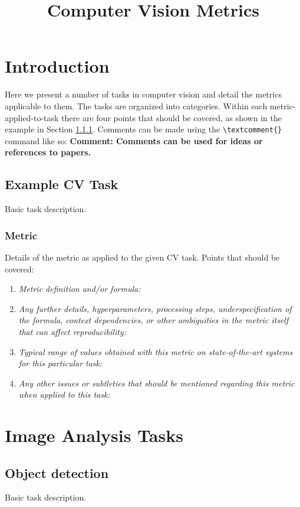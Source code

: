 \documentclass[a4paper,11pt]{article}
\title{Computer Vision Metrics}
\author{}
\date{}
\newcommand{\textcomment}[1]{{{\bf \color{Aquamarine} Comment: #1}}}
\begin{document}
\maketitle

\section{Introduction}
Here we present a number of tasks in computer vision and detail the metrics applicable to them. The tasks are organized into categories. Within each metric-applied-to-task there are four points that should be covered, as shown in the example in Section \ref{example_metric_applied_to_task}. Comments can be made using the \verb+\textcomment{}+ command like so: \textcomment{Comments can be used for ideas or references to papers.}

\subsection{Example CV Task} \label{example_cv_task}
    Basic task description. 
    \subsubsection{Metric} \label{example_metric_applied_to_task}
    Details of the metric as applied to the given CV task. Points that should be covered:
    \begin{enumerate}[label=\alph*.]
        \item \textit{Metric definition and/or formula:}
            \bigskip
            \item \textit{Any further details, hyperparameters, processing steps, underspecification of the formula, context dependencies, or other ambiguities in the metric itself that can affect reproducibility:}
            \bigskip
            \item \textit{Typical range of values obtained with this metric on state-of-the-art systems for this particular task:}
            \bigskip
            \item \textit{Any other issues or subtleties that should be mentioned regarding this metric when applied to this task:}
            \bigskip
    \end{enumerate}


\section{Image Analysis Tasks}
\subsection{Object detection}
    Basic task description.
\end{document}
